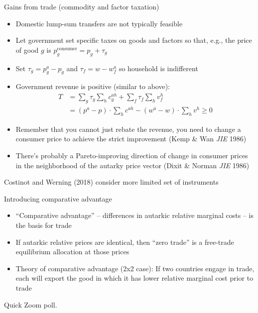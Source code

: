 \documentclass[10pt,notes=hide]{beamer}
\begin{document}
\begin{frame}{Gains from trade (commodity and factor taxation)}
\begin{itemize}
	\item Domestic lump-sum transfers are not typically feasible
	\item Let government set specific taxes on goods and factors so that, e.g., the price of good $g$ is $p_g^{\text{consumer}} = p_g + \tau_g$
	\item Set $\tau_g = p^a_g - p_g$ and $\tau_f = w - w^a_f$ so household is indifferent
	\item Government revenue is positive (similar to above):
	\begin{align*}
	T &= \sum\nolimits_g \tau_g \sum\nolimits_h c^{ah}_g + \sum\nolimits_f \tau_f \sum\nolimits_h v^h_f \\
	&= (p^a - p) \cdot \sum_h c^{ah} - (w^a - w) \cdot \sum_h v^h \geq 0
	\end{align*}
	\item Remember that you cannot just rebate the revenue, you need to change a consumer price to achieve the strict improvement (Kemp \& Wan \textit{JIE} 1986)
	\item There's probably a Pareto-improving direction of change in consumer prices in the neighborhood of the autarky price vector (Dixit \& Norman \textit{JIE} 1986)
\end{itemize}
{\footnotesize Costinot and Werning (2018) consider more limited set of instruments}
\end{frame}
\begin{frame}{Introducing comparative advantage}
\begin{itemize}
	\item ``Comparative advantage'' -- differences in autarkic relative marginal costs -- is the basis for trade
	\item If autarkic relative prices are identical, then ``zero trade'' is a free-trade equilibrium allocation at those prices
	\item Theory of comparative advantage (2x2 case): If two countries engage in trade, each will export the good in which it has lower relative marginal cost prior to trade
\end{itemize}
Quick Zoom poll.
\end{frame}
\end{document}
